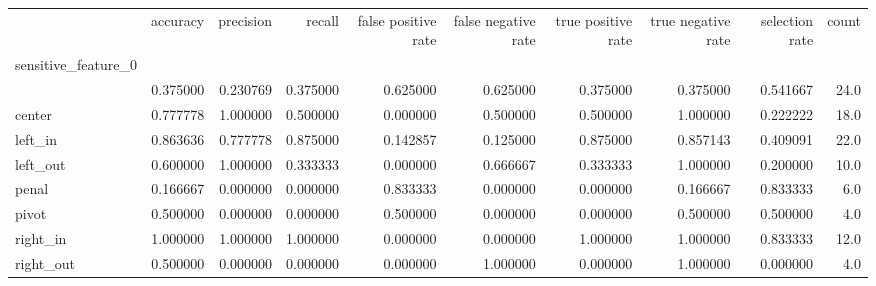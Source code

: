 \begin{tabular}{lrrrrrrrrr}
\toprule
{} &  accuracy &  precision &    recall &  false positive rate &  false negative rate &  true positive rate &  true negative rate &  selection rate &  count \\
sensitive\_feature\_0 &           &            &           &                      &                      &                     &                     &                 &        \\
\midrule
                    &  0.375000 &   0.230769 &  0.375000 &             0.625000 &             0.625000 &            0.375000 &            0.375000 &        0.541667 &   24.0 \\
center              &  0.777778 &   1.000000 &  0.500000 &             0.000000 &             0.500000 &            0.500000 &            1.000000 &        0.222222 &   18.0 \\
left\_in             &  0.863636 &   0.777778 &  0.875000 &             0.142857 &             0.125000 &            0.875000 &            0.857143 &        0.409091 &   22.0 \\
left\_out            &  0.600000 &   1.000000 &  0.333333 &             0.000000 &             0.666667 &            0.333333 &            1.000000 &        0.200000 &   10.0 \\
penal               &  0.166667 &   0.000000 &  0.000000 &             0.833333 &             0.000000 &            0.000000 &            0.166667 &        0.833333 &    6.0 \\
pivot               &  0.500000 &   0.000000 &  0.000000 &             0.500000 &             0.000000 &            0.000000 &            0.500000 &        0.500000 &    4.0 \\
right\_in            &  1.000000 &   1.000000 &  1.000000 &             0.000000 &             0.000000 &            1.000000 &            1.000000 &        0.833333 &   12.0 \\
right\_out           &  0.500000 &   0.000000 &  0.000000 &             0.000000 &             1.000000 &            0.000000 &            1.000000 &        0.000000 &    4.0 \\
\bottomrule
\end{tabular}
